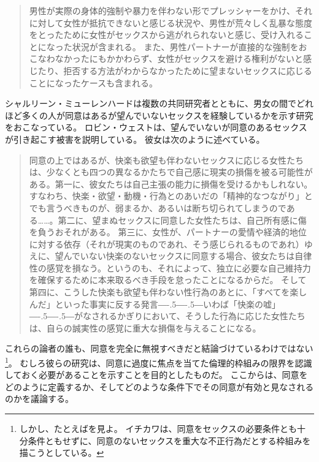 \documentclass[paper=a4,book,openany]{jlreq}
\newcommand{\ig}[1]{}           %
\def\DDASH{―\kern-.5\zw―\kern-.5\zw―}
\begin{document}
\begin{quote}
男性が実際の身体的強制や暴力を伴わない形でプレッシャーをかけ、それに対して女性が抵抗できないと感じる状況や、男性が荒々しく乱暴な態度をとったために女性がセックスから逃がれられないと感じ、受け入れることになった状況が含まれる。
また、男性パートナーが直接的な強制をおこなわなかったにもかかわらず、女性がセックスを避ける権利がないと感じたり、拒否する方法がわからなかったために望まないセックスに応じることになったケースも含まれる。
\citep[p.136]{gavey04:_just_sex}
\end{quote}

シャルリーン・ミューレンハードは複数の共同研究者とともに、男女の間でどれほど多くの人が同意はあるが望んでいないセックスを経験しているかを示す研究をおこなっている\citep[cf.][]{muehlenhard05:_wantin_not_wantin_sex,peterson07:_concep_wanted_women_consen_noncon_sexual_exper}。
ロビン・ウェスト\ig{Robin West}は、望んでいないが同意のあるセックスが引き起こす被害を説明している。
彼女は次のように述べている。

\begin{quote}
同意の上ではあるが、快楽も欲望も伴わないセックスに応じる女性たちは、少なくとも四つの異なるかたちで自己感に現実の損傷を被る可能性がある。第一に、彼女たちは自己主張の能力に損傷を受けるかもしれない。すなわち、快楽・欲望・動機・行為とのあいだの「精神的なつながり」とでも言うべきものが、弱まるか、あるいは断ち切られてしまうのである……。第二に、望まぬセックスに同意した女性たちは、自己所有感に傷を負うおそれがある。
第三に、女性が、パートナーの愛情や経済的地位に対する依存（それが現実のものであれ、そう感じられるものであれ）ゆえに、望んでいない快楽のないセックスに同意する場合、彼女たちは自律性の感覚を損なう。というのも、それによって、独立に必要な自己維持力を確保するために本来取るべき手段を怠ったことになるからだ。
そして第四に、こうした快楽も欲望も伴わない性行為のあとに、「すべてを楽しんだ」といった事実に反する発言{\DDASH}いわば「快楽の嘘」{\DDASH}がなされるかぎりにおいて、そうした行為に応じた女性たちは、自らの誠実性の感覚に重大な損傷を与えることになる。\citep[p.53]{west95:_harms_of_consen_sex}
\end{quote}

これらの論者の誰も、同意を完全に無視すべきだと結論づけているわけではない\footnote{しかし、たとえば\citet{ichikawa20:_presup_consen}を見よ。
イチカワは、同意をセックスの必要条件とも十分条件ともせずに、同意のないセックスを重大な不正行為だとする枠組みを描こうとしている。
\nocite{ichikawa20:_presup_consen}}。
むしろ彼らの研究は、同意に過度に焦点を当てた倫理的枠組みの限界を認識しておく必要があることを示すことを目的としたものだ。
ここからは、同意をどのように定義するか、そしてどのような条件下でその同意が有効と見なされるのかを議論する。
\end{document}
